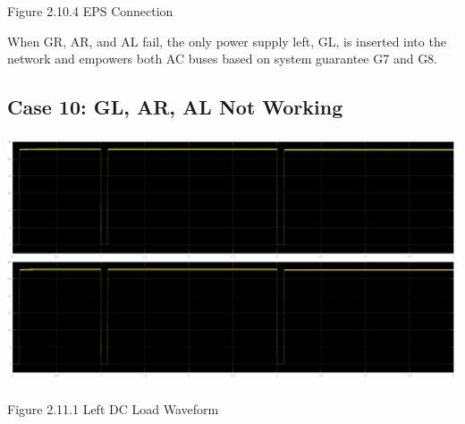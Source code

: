 \documentclass{mcmthesis}
\begin{document}
\begin{center}
\small{Figure 2.10.4 EPS Connection}
\end{center}
When GR, AR,  and AL fail,  the only power supply left, GL, is inserted into the network and empowers both AC buses based on system guarantee G7 and G8.
\pagebreak

\subsection{Case 10: GL, AR, AL Not Working}
\begin{center}
\includegraphics[trim= 0 0.28\imageheight{} 0 0, clip, width = 0.165\imageheight{}]{gl_ar_al_load1.png}
\end{center}
\begin{center}
\small{Figure 2.11.1 Left DC Load Waveform}
\end{center}
\end{document}
